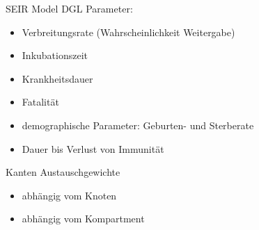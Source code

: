     

    \begin{frame}{SEIR Model}
        DGL Parameter: 
        \begin{itemize}
            \item Verbreitungsrate (Wahrscheinlichkeit Weitergabe)
            \item Inkubationszeit
            \item Krankheitsdauer
            \item Fatalität 
            \item demographische Parameter: Geburten- und Sterberate
            \item Dauer bis Verlust von Immunität
        \end{itemize}
    
    \end{frame}




    

            
            
    
    \begin{frame}{Kanten}
        Austauschgewichte
        \begin{itemize}
            \item abhängig vom Knoten
            \item abhängig vom Kompartment
        \end{itemize}

        \begin{figure}
        \end{figure}
    \end{frame}


